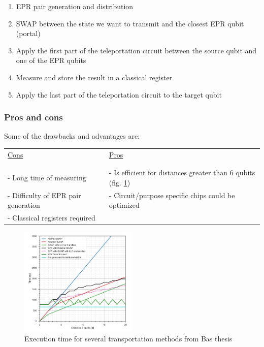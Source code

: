 \documentclass[11pt]{article}
\begin{document}
\begin{enumerate}
\item EPR pair generation and distribution
\item SWAP between the state we want to transmit and the closest EPR qubit (portal)
\item Apply the first part of the teleportation circuit between the source qubit and one of the EPR qubits
\item Measure and store the result in a classical register
\item Apply the last part of the teleportation circuit to the target qubit
\end{enumerate}


\subsubsection{Pros and cons}
\label{sec:org1aeddfa}

Some of the drawbacks and advantages are:

\begin{table}[htbp]
\centering
\begin{tabular}{ll}
\uline{Cons} & \uline{Pros}\\
 & \\
 & \\
- Long time of measuring & - Is efficient for distances greater than 6 qubits (fig. \ref{fig:org55aa851})\\
- Difficulty of EPR pair generation & - Circuit/purpose specific chips could be optimized\\
- Classical registers required & \\
\end{tabular}
\end{table}


\begin{figure}[htbp]
\centering
\includegraphics[width=0.5\textwidth]{total_exec_t_transp_methods.png}
\caption{\label{fig:org55aa851}
Execution time for several transportation methods from Bas thesis}
\end{figure}
\end{document}
